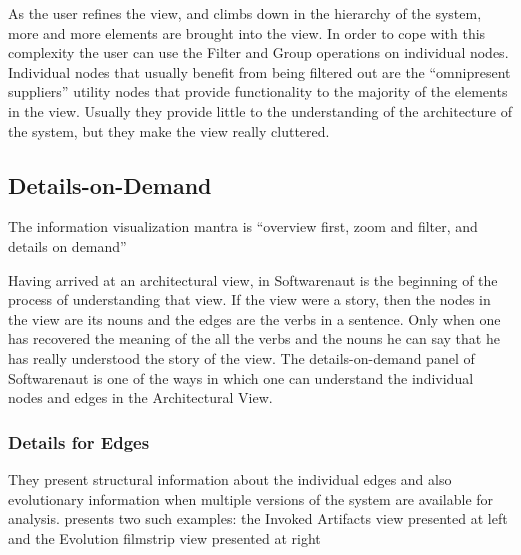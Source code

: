 \documentclass[preprint,12pt]{elsarticle}
\begin{document}
As the user refines the view, and climbs down in the hierarchy of the system, more and more elements are brought into the view. In order to cope with this complexity the user can use the Filter and Group operations on individual nodes. Individual nodes that usually benefit from being filtered out are the “omnipresent suppliers” utility nodes that provide functionality to the majority of the elements in the view. Usually they provide little to the understanding of the architecture of the system, but they make the view really cluttered. 


\newpage
\subsection {Details-on-Demand}

The information visualization mantra is “overview first, zoom and filter, and details on demand” 

Having arrived at an architectural view, in Softwarenaut is the beginning of the process of understanding that view. If the view were a story, then the nodes in the view are its nouns and the edges are the verbs in a sentence. Only when one has recovered the meaning of the all the verbs and the nouns he can say that he has really understood the story of the view. The details-on-demand panel of Softwarenaut is one of the ways in which one can understand the individual nodes and edges in the Architectural View.


\subsubsection {Details for Edges}
They present structural information about the individual edges and also evolutionary information when multiple versions of the system are available for analysis.  presents two such examples: 
the Invoked Artifacts view presented at left and the Evolution filmstrip view \cite{lungu-relevo} presented at right 
\end{document}
